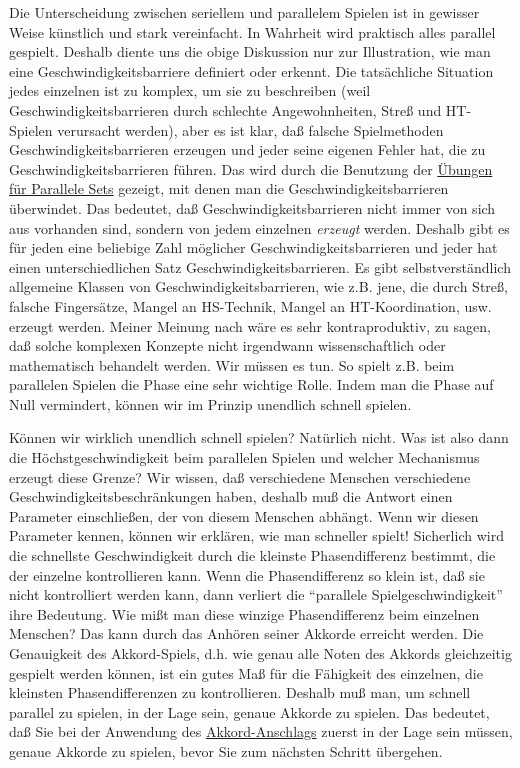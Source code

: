 Die Unterscheidung zwischen seriellem und parallelem Spielen ist in gewisser Weise künstlich und stark vereinfacht.
In Wahrheit wird praktisch alles parallel gespielt.
Deshalb diente uns die obige Diskussion nur zur Illustration, wie man eine Geschwindigkeitsbarriere definiert oder erkennt.
Die tatsächliche Situation jedes einzelnen ist zu komplex, um sie zu beschreiben (weil Geschwindigkeitsbarrieren durch schlechte Angewohnheiten, Streß und HT-Spielen verursacht werden), aber es ist klar, daß falsche Spielmethoden Geschwindigkeitsbarrieren erzeugen und jeder seine eigenen Fehler hat, die zu Geschwindigkeitsbarrieren führen.
Das wird durch die Benutzung der \hyperref[c1iii7b]{Übungen für Parallele Sets} gezeigt, mit denen man die Geschwindigkeitsbarrieren überwindet.
Das bedeutet, daß Geschwindigkeitsbarrieren nicht immer von sich aus vorhanden sind, sondern von jedem einzelnen \textit{erzeugt} werden.
Deshalb gibt es für jeden eine beliebige Zahl möglicher Geschwindigkeitsbarrieren und jeder hat einen unterschiedlichen Satz Geschwindigkeitsbarrieren.
Es gibt selbstverständlich allgemeine Klassen von Geschwindigkeitsbarrieren, wie z.B. jene, die durch Streß, falsche Fingersätze, Mangel an HS-Technik, Mangel an HT-Koordination, usw. erzeugt werden.
Meiner Meinung nach wäre es sehr kontraproduktiv, zu sagen, daß solche komplexen Konzepte nicht irgendwann wissenschaftlich oder mathematisch behandelt werden.
Wir müssen es tun.
So spielt z.B. beim parallelen Spielen die Phase eine sehr wichtige Rolle.
Indem man die Phase auf Null vermindert, können wir im Prinzip unendlich schnell spielen.

Können wir wirklich unendlich schnell spielen? Natürlich nicht.
Was ist also dann die Höchstgeschwindigkeit beim parallelen Spielen und welcher Mechanismus erzeugt diese Grenze?
Wir wissen, daß verschiedene Menschen verschiedene Geschwindigkeitsbeschränkungen haben, deshalb muß die Antwort einen Parameter einschließen, der von diesem Menschen abhängt.
Wenn wir diesen Parameter kennen, können wir erklären, wie man schneller spielt!
Sicherlich wird die schnellste Geschwindigkeit durch die kleinste Phasendifferenz bestimmt, die der einzelne kontrollieren kann.
Wenn die Phasendifferenz so klein ist, daß sie nicht kontrolliert werden kann, dann verliert die \enquote{parallele Spielgeschwindigkeit} ihre Bedeutung.
Wie mißt man diese winzige Phasendifferenz beim einzelnen Menschen?
Das kann durch das Anhören seiner Akkorde erreicht werden.
Die Genauigkeit des Akkord-Spiels, d.h. wie genau alle Noten des Akkords gleichzeitig gespielt werden können, ist ein gutes Maß für die Fähigkeit des einzelnen, die kleinsten Phasendifferenzen zu kontrollieren.
Deshalb muß man, um schnell parallel zu spielen, in der Lage sein, genaue Akkorde zu spielen.
Das bedeutet, daß Sie bei der Anwendung des \hyperref[c1ii9]{Akkord-Anschlags} zuerst in der Lage sein müssen, genaue Akkorde zu spielen, bevor Sie zum nächsten Schritt übergehen.

